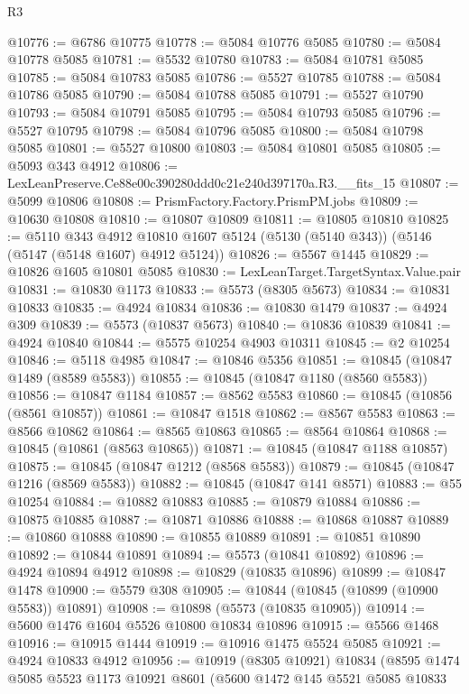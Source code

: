 \begin{lexlean}{R3}
\begin{coremodule}
@10776 := @6786 @10775
@10778 := @5084 @10776 @5085
@10780 := @5084 @10778 @5085
@10781 := @5532 @10780
@10783 := @5084 @10781 @5085
@10785 := @5084 @10783 @5085
@10786 := @5527 @10785
@10788 := @5084 @10786 @5085
@10790 := @5084 @10788 @5085
@10791 := @5527 @10790
@10793 := @5084 @10791 @5085
@10795 := @5084 @10793 @5085
@10796 := @5527 @10795
@10798 := @5084 @10796 @5085
@10800 := @5084 @10798 @5085
@10801 := @5527 @10800
@10803 := @5084 @10801 @5085
@10805 := @5093 @343 @4912
@10806 := LexLeanPreserve.Ce88e00c390280ddd0c21e240d397170a.R3.__fits_15
@10807 := @5099 @10806
@10808 := PrismFactory.Factory.PrismPM.jobs
@10809 := @10630 @10808
@10810 := @10807 @10809
@10811 := @10805 @10810
@10825 := @5110
    @343
    @4912
    @10810
    @1607
    @5124
    (@5130 (@5140 @343))
    (@5146 (@5147 (@5148 @1607) @4912 @5124))
@10826 := @5567 @1445
@10829 := @10826 @1605 @10801 @5085
@10830 := LexLeanTarget.TargetSyntax.Value.pair
@10831 := @10830 @1173
@10833 := @5573 (@8305 @5673)
@10834 := @10831 @10833
@10835 := @4924 @10834
@10836 := @10830 @1479
@10837 := @4924 @309
@10839 := @5573 (@10837 @5673)
@10840 := @10836 @10839
@10841 := @4924 @10840
@10844 := @5575 @10254 @4903 @10311
@10845 := @2 @10254
@10846 := @5118 @4985
@10847 := @10846 @5356
@10851 := @10845 (@10847 @1489 (@8589 @5583))
@10855 := @10845 (@10847 @1180 (@8560 @5583))
@10856 := @10847 @1184
@10857 := @8562 @5583
@10860 := @10845 (@10856 (@8561 @10857))
@10861 := @10847 @1518
@10862 := @8567 @5583
@10863 := @8566 @10862
@10864 := @8565 @10863
@10865 := @8564 @10864
@10868 := @10845 (@10861 (@8563 @10865))
@10871 := @10845 (@10847 @1188 @10857)
@10875 := @10845 (@10847 @1212 (@8568 @5583))
@10879 := @10845 (@10847 @1216 (@8569 @5583))
@10882 := @10845 (@10847 @141 @8571)
@10883 := @55 @10254
@10884 := @10882 @10883
@10885 := @10879 @10884
@10886 := @10875 @10885
@10887 := @10871 @10886
@10888 := @10868 @10887
@10889 := @10860 @10888
@10890 := @10855 @10889
@10891 := @10851 @10890
@10892 := @10844 @10891
@10894 := @5573 (@10841 @10892)
@10896 := @4924 @10894 @4912
@10898 := @10829 (@10835 @10896)
@10899 := @10847 @1478
@10900 := @5579 @308
@10905 := @10844 (@10845 (@10899 (@10900 @5583)) @10891)
@10908 := @10898 (@5573 (@10835 @10905))
@10914 := @5600 @1476 @1604 @5526 @10800 @10834 @10896
@10915 := @5566 @1468
@10916 := @10915 @1444
@10919 := @10916 @1475 @5524 @5085
@10921 := @4924 @10833 @4912
@10956 := @10919
    (@8305 @10921)
    @10834
    (@8595
      @1474
      @5085
      @5523
      @1173
      @10921
      @8601
      (@5600
        @1472
        @145
        @5521
        @5085
        @10833

\end{coremodule}
\end{lexlean}
